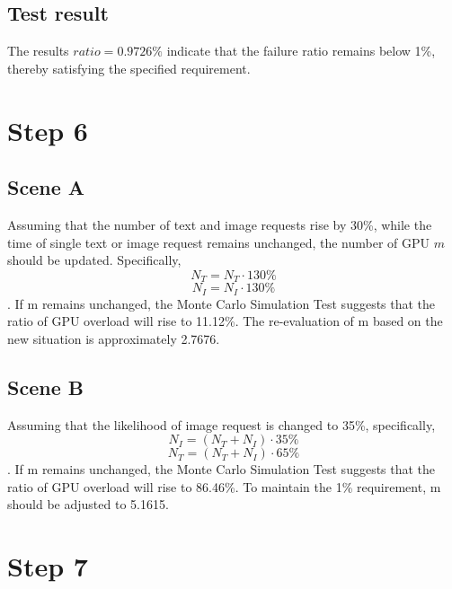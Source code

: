 \documentclass[10pt,a4paper]{article}
\begin{document}
	\subsection{Test result}
	The results $ratio = 0.9726\%$ indicate that the failure ratio remains below 1\%, thereby satisfying the specified requirement.
	
	\section{Step 6}
	
	\subsection{Scene A}
	Assuming that the number of text and image requests rise by 30\%, while the time of single text or image request remains unchanged, the number of GPU $m$ should be updated. Specifically,
	\[
		N_T = N_T \cdot 130\%
	\]
	\[
		N_I = N_I \cdot 130\%
	\]. If m remains unchanged, the Monte Carlo Simulation Test suggests that the ratio of GPU overload will rise to 11.12\%. The re-evaluation of m based on the new situation is approximately 2.7676.
	\subsection{Scene B}	
	Assuming that the likelihood of image request is changed to 35\%, specifically, 
	\[
		N_I = (N_T+N_I)\cdot35\%
	\]
	\[
		N_T = (N_T+N_I)\cdot65\%
	\]. If m remains unchanged, the Monte Carlo Simulation Test suggests that the ratio of GPU overload will rise to 86.46\%. To maintain the 1\% requirement, m should be adjusted to 5.1615.
	\section{Step 7}
\end{document}
